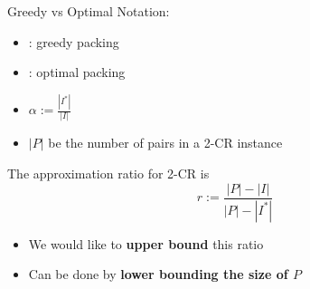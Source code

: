\begin{frame}{Greedy vs Optimal}
Notation:
\begin{itemize}
\pause\item
{}: greedy packing

\pause\item
{}: optimal packing

\pause\item
$\alpha := \frac{|I^*|}{|I|}$ 

\pause\item
$|P|$ be the number of pairs in a 2-CR instance

\end{itemize}

\pause
\begin{observation}
The approximation ratio for 2-CR is
$$ r := \frac{|P| - |I|}{|P| - |I^*|} $$
\end{observation}

\begin{itemize}
\pause\item
We would like to \textbf{upper bound} this ratio
\pause\item
Can be done by \textbf{lower bounding the size of $P$}
\end{itemize}


\end{frame}